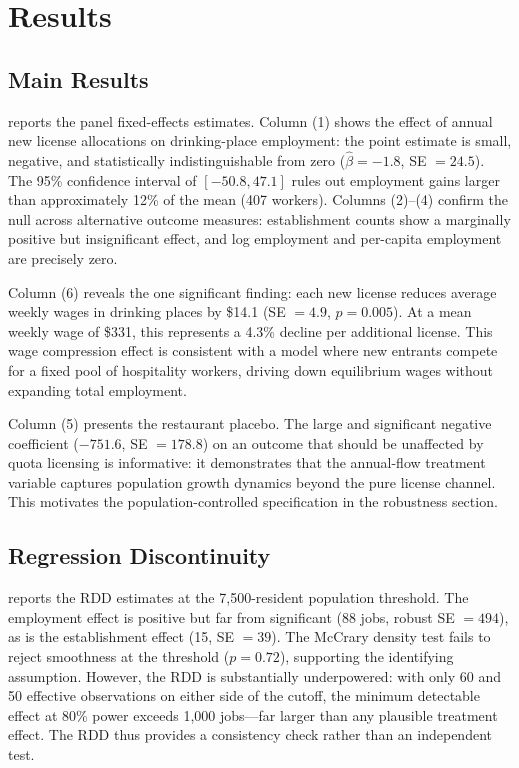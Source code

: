 \documentclass[12pt]{article}
\begin{document}
\section{Results}

\subsection{Main Results}



 reports the panel fixed-effects estimates. Column (1) shows the effect of annual new license allocations on drinking-place employment: the point estimate is small, negative, and statistically indistinguishable from zero ($\hat{\beta} = -1.8$, SE $= 24.5$). The 95\% confidence interval of $[-50.8, 47.1]$ rules out employment gains larger than approximately 12\% of the mean (407 workers). Columns (2)--(4) confirm the null across alternative outcome measures: establishment counts show a marginally positive but insignificant effect, and log employment and per-capita employment are precisely zero.

Column (6) reveals the one significant finding: each new license reduces average weekly wages in drinking places by \$14.1 (SE $= 4.9$, $p = 0.005$). At a mean weekly wage of \$331, this represents a 4.3\% decline per additional license. This wage compression effect is consistent with a model where new entrants compete for a fixed pool of hospitality workers, driving down equilibrium wages without expanding total employment.

Column (5) presents the restaurant placebo. The large and significant negative coefficient ($-751.6$, SE $= 178.8$) on an outcome that should be unaffected by quota licensing is informative: it demonstrates that the annual-flow treatment variable captures population growth dynamics beyond the pure license channel. This motivates the population-controlled specification in the robustness section.

\subsection{Regression Discontinuity}



 reports the RDD estimates at the 7,500-resident population threshold. The employment effect is positive but far from significant (88 jobs, robust SE $= 494$), as is the establishment effect (15, SE $= 39$). The McCrary density test fails to reject smoothness at the threshold ($p = 0.72$), supporting the identifying assumption. However, the RDD is substantially underpowered: with only 60 and 50 effective observations on either side of the cutoff, the minimum detectable effect at 80\% power exceeds 1,000 jobs---far larger than any plausible treatment effect. The RDD thus provides a consistency check rather than an independent test.
\end{document}

